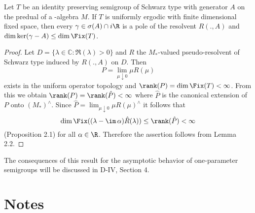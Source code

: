 \begin{theorem}\label{thm:d3-2.5}
Let $T$ be an identity preserving semigroup of Schwarz type with generator $A$ on the predual of a \WA-algebra $M$.
If $T$ is uniformly ergodic with finite dimensional fixed space, then every $\gamma \in \sigma(A) \cap i\R$ is a pole of the resolvent $R(.,A)$ and $\dim \ker(\gamma - A) \leq \dim \Fix(T)$.
\end{theorem}

\begin{proof}
Let $D = \{\lambda \in \mathbb{C} \colon \Re(\lambda) > 0\}$ and $R$ the $M_{*}$-valued pseudo-resolvent of Schwarz type induced by $R(.,A)$ on $D$.
Then
\[
P = \lim_{\mu \downarrow 0}\mu R(\mu)
\]
exists in the uniform operator topology and $\rank(P) = \dim \Fix(T) < \infty$.
From this we obtain $\rank(P) = \rank(\hat{P}) < \infty$ where $\hat{P}$ is the canonical extension of $P$ onto $(M_{*})^{\wedge}$.
Since $\hat{P} = \lim_{\mu \downarrow 0} \mu R(\mu)^{\wedge}$ it follows that
\[
\dim \Fix((\lambda - \im\,\alpha)\hat{R}(\lambda)) \leq \rank(\hat{P}) < \infty
\]
(Proposition 2.1) for all $\alpha \in \R$.
Therefore the assertion follows from Lemma 2.2.
\end{proof}

The consequences of this result for the asymptotic behavior of one-parameter semigroups will be discussed in D-IV, Section 4.

\section*{Notes}\label{notes:d3-notes}

